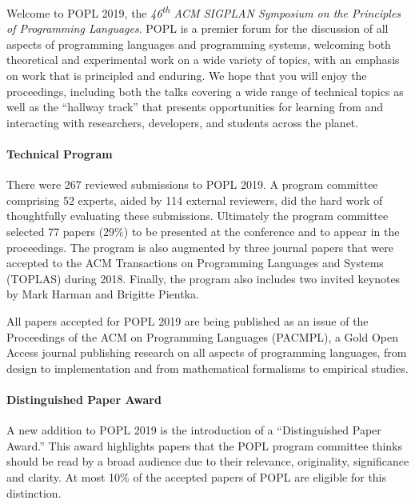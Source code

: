 \label{Preface}


\newcommand\person[1]{{#1}}

\noindent

Welcome to POPL 2019, the
\emph{46\textsuperscript{th} ACM SIGPLAN Symposium
on the Principles of Programming Languages}.
%
POPL is a premier forum for the discussion of all aspects
of programming languages and programming systems, welcoming
both theoretical and experimental work on a wide variety of
topics, with an emphasis on work that is principled and enduring.
%
We hope that you will enjoy the proceedings,
including both the talks covering a wide range
of technical topics as well as the ``hallway track''
that presents opportunities for learning from
and interacting with researchers, developers,
and students across the planet.


\paragraph{Technical Program}
%
There were 267 reviewed submissions to POPL 2019.
%
A program committee comprising 52 experts,
aided by 114 external reviewers, did the hard work of
thoughtfully evaluating these submissions.
%
Ultimately the program committee selected 77 papers (29\%)
to be presented at the conference and to appear in the
proceedings. 
%
The program is also augmented by three journal papers that were accepted to
the ACM Transactions on Programming Languages and Systems (TOPLAS) during
2018.
%
Finally, the program also includes two invited keynotes by Mark Harman
and Brigitte Pientka.

All papers accepted for POPL 2019 are being published as an issue of the 
Proceedings of the ACM on Programming Languages (PACMPL), a Gold Open
Access journal publishing research on all aspects of programming languages,
from design to implementation and from mathematical formalisms to empirical
studies.

\paragraph{Distinguished Paper Award}

A new addition to POPL 2019 is the introduction of a ``Distinguished Paper
Award.'' This award highlights papers that the POPL program committee thinks
should be read by a broad audience due to their relevance, originality,
significance and clarity. At most 10\% of the accepted papers of POPL are
eligible for this distinction.

